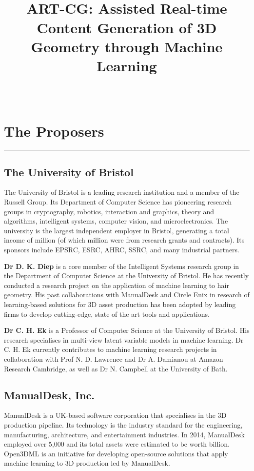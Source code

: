 \documentclass[a4paper, 11pt, onecolumn]{article} %
\title{
	\vspace{-3.0cm}
	\horrule{0.4pt} \\[0.2cm] %
	\vspace{0.2cm}
	\Large ART-CG: Assisted Real-time Content Generation of 3D Geometry through Machine Learning\\
	\horrule{0.4pt} \\[0cm] %
	\vspace{-0.5cm}
}
\date{} %
\numberwithin{equation}{section} %
\numberwithin{figure}{section} %
\numberwithin{table}{section} %
\begin{document}
\maketitle
\thispagestyle{fancy} %

\section*{The Proposers}
\hrule\vspace{0.5em}
\subsection*{The University of Bristol}
The University of Bristol is a leading research institution and a member of the Russell Group. Its Department of Computer Science has pioneering research groups in cryptography, robotics, interaction and graphics, theory and algorithms, intelligent systems, computer vision, and microelectronics. 
The university is the largest independent employer in Bristol, generating a total income of  million (of which  million were from research grants and contracts). Its sponsors include EPSRC, ESRC, AHRC, SSRC, and many industrial partners.

\textbf{Dr D. K. Diep} is a core member of the Intelligent Systems research group in the Department of Computer Science at the University of Bristol. He has recently conducted a research project on the application of machine learning to hair geometry. His past collaborations with ManualDesk and Circle Enix in research of learning-based solutions for 3D asset production has been adopted by leading firms to develop cutting-edge, state of the art tools and applications.

\textbf{Dr C. H. Ek} is a Professor of Computer Science at the University of Bristol. His research specialises in multi-view latent variable models in machine learning. Dr C. H. Ek currently contributes to machine learning research projects in collaboration with Prof N. D. Lawrence and Dr A. Damianou at Amazon Research Cambridge, as well as Dr N. Campbell at the University of Bath.

\subsection*{ManualDesk, Inc.}
ManualDesk is a UK-based software corporation that specialises in the 3D production pipeline. Its technology is the industry standard for the engineering, manufacturing, architecture, and entertainment industries. In 2014, ManualDesk employed over 5,000 and its total assets were estimated to be worth  billion. Open3DML is an initiative for developing open-source solutions that apply machine learning to 3D production led by ManualDesk. 
\end{document}
